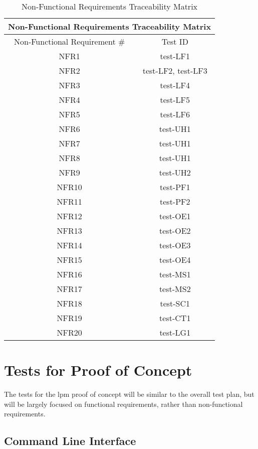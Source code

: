 \documentclass[12pt, titlepage]{article}
\begin{document}
\begin{table}[H]
    \centering
    \begin{tabular}{|c|c|}
\hline
\multicolumn{2}{|c|}{Non-Functional Requirements Traceability Matrix} \\ \hline
Non-Functional Requirement \# & Test ID \\ \hline
NFR1 & test-LF1 \\ \hline
NFR2 & test-LF2, test-LF3 \\ \hline
NFR3 & test-LF4 \\ \hline
NFR4 & test-LF5 \\ \hline
NFR5 & test-LF6 \\ \hline
NFR6 & test-UH1 \\ \hline
NFR7 & test-UH1 \\ \hline
NFR8 & test-UH1 \\ \hline
NFR9 & test-UH2 \\ \hline
NFR10 & test-PF1 \\ \hline
NFR11 & test-PF2 \\ \hline
NFR12 & test-OE1 \\ \hline
NFR13 & test-OE2 \\ \hline
NFR14 & test-OE3 \\ \hline
NFR15 & test-OE4 \\ \hline
NFR16 & test-MS1 \\ \hline
NFR17 & test-MS2 \\ \hline
NFR18 & test-SC1 \\ \hline
NFR19 & test-CT1 \\ \hline
NFR20 & test-LG1 \\ \hline
\end{tabular}
    \caption{Non-Functional Requirements Traceability Matrix}
    \label{tab:nfrtrace}
\end{table}


\section{Tests for Proof of Concept}

The tests for the lpm proof of concept will be similar to the overall test plan, but will be largely focused on functional requirements, rather than non-functional requirements.

\subsection{Command Line Interface}
\end{document}
